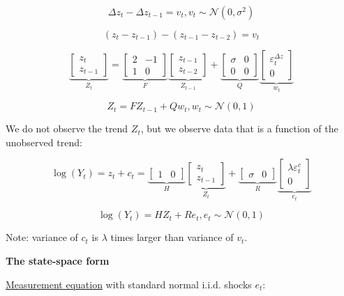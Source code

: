 \documentclass{article}
\begin{document}
\[\Delta z_t-\Delta z_{t-1}=v_t, v_t\sim\mathcal{N}(0,\sigma^2) \]

\[(z_t-z_{t-1})-(z_{t-1}-z_{t-2})=v_t \]


\[
\underbrace{
\begin{bmatrix}
    z_t \\ z_{t-1}
\end{bmatrix}
}_{Z_t}
=
\underbrace{
\begin{bmatrix}
    2 & -1 \\
    1 & 0
\end{bmatrix}
}_{F}
\underbrace{
\begin{bmatrix}
    z_{t-1} \\ z_{t-2}
\end{bmatrix}
}_{Z_{t-1}}
+
\underbrace{
\begin{bmatrix}
    \sigma & 0 \\
    0 & 0
\end{bmatrix}
}_{Q}
\underbrace{
\begin{bmatrix}
    \varepsilon_t^{\Delta z} \\ 0
\end{bmatrix}
}_{w_t}
\]

\[Z_t=FZ_{t-1}+Qw_t, w_t\sim\mathcal{N}(0, 1) \]

We do not observe the trend $Z_t$, but we observe data that is a function of the unobserved trend:

\[
\log(Y_t)=z_t+c_t=
\underbrace{
\begin{bmatrix}
    1 & 0
\end{bmatrix}
}_{H}
\underbrace{
\begin{bmatrix}
    z_t \\ z_{t-1}
\end{bmatrix}
}_{Z_t}
+
\underbrace{
\begin{bmatrix}
    \sigma & 0
\end{bmatrix}
}_{R}
\underbrace{
\begin{bmatrix}
    \lambda\varepsilon_t^c \\ 0
\end{bmatrix}
}_{e_t}
\]

\[
\log(Y_t)=HZ_t+Re_t, e_t\sim\mathcal{N}(0, 1)
\]

Note: variance of $c_t$ is $\lambda$ times larger than variance of $v_t$.

\vspace{4mm}

\textbf{The state-space form}

\underline{Measurement equation} with standard normal i.i.d. shocks $e_t$:
\end{document}
